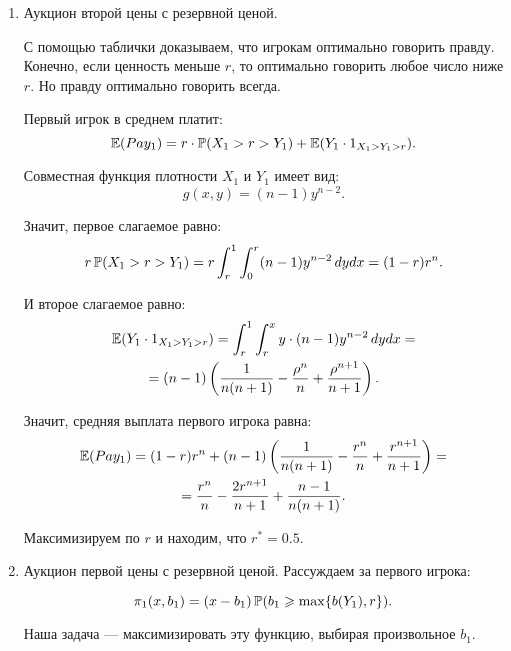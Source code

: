 \begin{enumerate}
\item Аукцион второй цены с резервной ценой.

С помощью таблички доказываем, что игрокам оптимально говорить правду. Конечно, если ценность меньше $ r $, то оптимально говорить любое число ниже $ r $. Но правду оптимально говорить всегда.

Первый игрок в среднем платит:
\begin{equation}
\E(Pay_{1})=r\cdot \P(X_{1}>r>Y_{1})+\E(Y_{1}\cdot 1_{X_{1}>Y_{1}>r}).
\end{equation}

Совместная функция плотности $ X_{1} $ и $ Y_{1} $ имеет вид:
\begin{equation}
g(x,y)=(n-1)y^{n-2}.
\end{equation}

Значит, первое слагаемое равно:
\begin{equation}
r\P(X_{1}>r>Y_{1})=
r\int_{r}^{1}\int_{0}^{r} (n-1)y^{n-2} \, dy dx=(1-r)r^{n}.
\end{equation}

И второе слагаемое равно:
\begin{multline} \label{E_Y_1XYr}
\E(Y_{1}\cdot 1_{X_{1}>Y_{1}>r})=\int_{r}^{1}\int_{r}^{x} y\cdot (n-1)y^{n-2} \, dy dx=\\
=(n-1)\left(\frac{1}{n(n+1)}-\frac{\rho^{n}}{n}+\frac{\rho^{n+1}}{n+1}\right).
\end{multline}

Значит, средняя выплата первого игрока равна:
\begin{multline}
\E(Pay_{1})=(1-r)r^{n}+(n-1)\left(\frac{1}{n(n+1)}-\frac{r^{n}}{n}+\frac{r^{n+1}}{n+1}\right)=\\
=\frac{r^{n}}{n}-\frac{2r^{n+1}}{n+1}+\frac{n-1}{n(n+1)}.
\end{multline}

Максимизируем по $ r $ и находим, что $ r^{*}=0.5 $.


\item Аукцион первой цены с резервной ценой. Рассуждаем за первого игрока:

\begin{equation}
\pi_{1}(x,b_{1})=(x-b_{1})\P(b_{1}\geq \max\{b(Y_{1}),r\}).
\end{equation}

Наша задача — максимизировать эту функцию, выбирая произвольное $ b_{1} $.


\end{enumerate}
